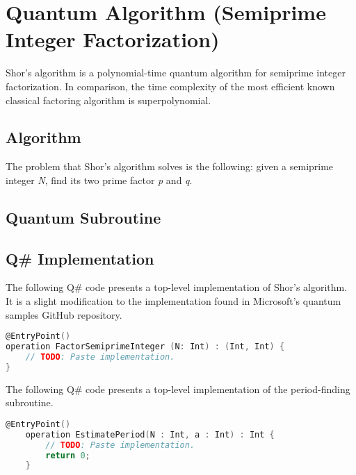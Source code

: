 %
%
\chapter {Quantum Algorithm (Semiprime Integer Factorization)}

Shor's algorithm is a polynomial-time quantum algorithm for semiprime integer factorization. In comparison, the time complexity of the most efficient known classical factoring algorithm is superpolynomial.

\section{Algorithm}

The problem that Shor's algorithm solves is the following: given a semiprime integer \textit{N}, find its two prime factor \textit{p} and \textit{q}.


\section{Quantum Subroutine}


\section{Q\# Implementation}

The following Q\# code presents a top-level implementation of Shor's algorithm. It is a slight modification to the implementation found in Microsoft's quantum samples GitHub repository.



\begin{lstlisting}[language=C]
@EntryPoint()
operation FactorSemiprimeInteger (N: Int) : (Int, Int) {
    // TODO: Paste implementation.
}
\end{lstlisting}

The following Q\# code presents a top-level implementation of the period-finding subroutine.

\begin{lstlisting}[language=C]
    @EntryPoint()
    operation EstimatePeriod(N : Int, a : Int) : Int {
        // TODO: Paste implementation.
        return 0;
    }
\end{lstlisting}
